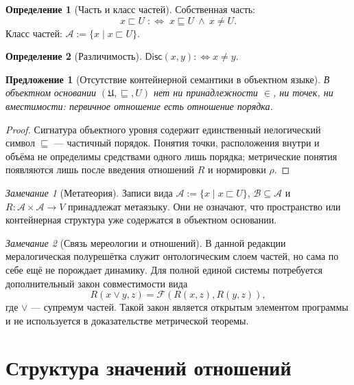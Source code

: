 \documentclass[12pt,a4paper,oneside]{book}
\theoremstyle{definition}
\newtheorem{definition}{Определение}[chapter]
\theoremstyle{plain}
\newtheorem{proposition}{Предложение}[chapter]
\theoremstyle{remark}
\newtheorem{remark}{Замечание}[chapter]
\newcommand{\Whole}{U}
\newcommand{\Parts}{\mathcal A}
\newcommand{\SubParts}{\mathcal B}
\newcommand{\Rel}{R}
\newcommand{\Values}{V}
\newcommand{\PartOf}{\sqsubseteq}
\newcommand{\PropPart}{\sqsubset}
\newcommand{\norm}{\rho}
\newcommand{\Disc}{\mathsf{Disc}}
\begin{document}
\begin{definition}[Часть и класс частей]
Собственная часть:
\[
x\PropPart\Whole\;:\Longleftrightarrow\;x\PartOf\Whole\ \wedge\ x\neq\Whole.
\]
Класс частей: $\Parts:=\{x\mid x\PropPart\Whole\}$.
\end{definition}

\begin{definition}[Различимость]
$\Disc(x,y):\Longleftrightarrow x\neq y$.
\end{definition}

\begin{proposition}[Отсутствие контейнерной семантики в объектном языке]
В объектном основании $(\mathfrak U,\PartOf,\Whole)$ нет ни принадлежности $\in$, ни
точек, ни вместимости: первичное отношение есть отношение порядка.
\end{proposition}

\begin{proof}
Сигнатура объектного уровня содержит единственный нелогический символ $\PartOf$ ---
частичный порядок. Понятия точки, расположения внутри и объёма не определимы
средствами одного лишь порядка; метрические понятия появляются лишь после введения
отношений $\Rel$ и нормировки $\norm$.
\end{proof}

\begin{remark}[Метатеория]
Записи вида $\Parts:=\{x\mid x\PropPart\Whole\}$, $\SubParts\subseteq\Parts$ и
$\Rel:\Parts\times\Parts\to\Values$ принадлежат метаязыку. Они не означают, что
пространство или контейнерная структура уже содержатся в объектном основании.
\end{remark}

\begin{remark}[Связь мереологии и отношений]
В данной редакции мералогическая полурешётка служит онтологическим слоем частей, но
сама по себе ещё не порождает динамику. Для полной единой системы потребуется
дополнительный закон совместимости вида
\[
\Rel(x\vee y,z)=\mathcal F(\Rel(x,z),\Rel(y,z)),
\]
где $\vee$ --- супремум частей. Такой закон является открытым элементом программы и
не используется в доказательстве метрической теоремы.
\end{remark}

\chapter{Структура значений отношений}
\end{document}
